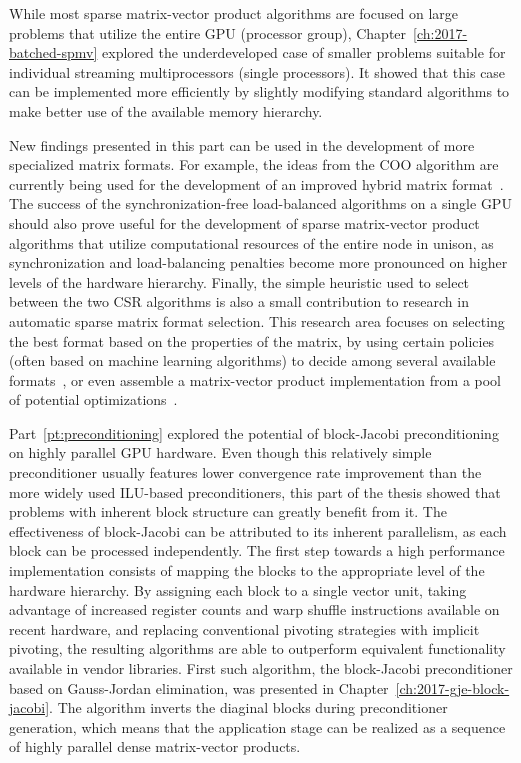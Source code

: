 While most sparse matrix-vector product algorithms are focused on large
problems that utilize the entire GPU (processor group),
Chapter~\ref{ch:2017-batched-spmv} explored the underdeveloped case of smaller
problems suitable for individual streaming multiprocessors (single processors).
It showed that this case can be implemented more efficiently by slightly
modifying standard algorithms to make better use of the available memory
hierarchy.

New findings presented in this part  can be used in the development of more
specialized matrix formats. For example, the ideas from the COO algorithm are
currently being used for the development of an improved hybrid matrix
format~\cite{hybrid}. The success of the synchronization-free load-balanced
algorithms on a single GPU should also prove useful for the development of
sparse matrix-vector product algorithms that utilize computational resources of
the entire node in unison, as synchronization and load-balancing penalties
become more pronounced on higher levels of the hardware hierarchy. Finally, the
simple heuristic used to select between the two CSR algorithms is also a small
contribution to research in automatic sparse matrix format selection. This
research area focuses on selecting the best format based on the properties of
the matrix, by using certain policies (often based on machine learning
algorithms) to decide among several available
formats~\cite{clspmv,gpu-selection}, or even assemble a matrix-vector product
implementation from a pool of potential optimizations~\cite{elafrou}.

Part~\ref{pt:preconditioning} explored the potential of block-Jacobi
preconditioning on highly parallel GPU hardware. Even though this relatively
simple preconditioner usually features lower convergence rate improvement than
the more widely used ILU-based preconditioners, this part of the thesis showed
that problems with inherent block structure can greatly benefit from it. The
effectiveness of block-Jacobi can be attributed to its inherent parallelism, as
each block can be processed independently. The first step towards a high
performance implementation consists of mapping the blocks to the appropriate
level of the hardware hierarchy. By assigning each block to a single vector
unit, taking advantage of increased register counts and warp shuffle
instructions available on recent hardware, and replacing conventional pivoting
strategies with implicit pivoting, the resulting algorithms are able to
outperform equivalent functionality available in vendor libraries. First such
algorithm, the block-Jacobi preconditioner based on Gauss-Jordan elimination,
was presented in Chapter~\ref{ch:2017-gje-block-jacobi}. The algorithm inverts
the diaginal blocks during preconditioner generation, which means that the
application stage can be realized as a sequence of highly parallel dense
matrix-vector products.

